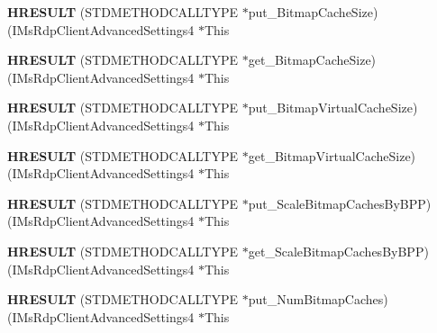 \begin{DoxyCompactItemize}
{\bfseries H\+R\+E\+S\+U\+LT} (S\+T\+D\+M\+E\+T\+H\+O\+D\+C\+A\+L\+L\+T\+Y\+PE $\ast$put\+\_\+\+Bitmap\+Cache\+Size)(I\+Ms\+Rdp\+Client\+Advanced\+Settings4 $\ast$This
\item 
\mbox{\label{struct_i_ms_rdp_client_advanced_settings4_vtbl_a38db615c2de2158bb538d771661db2e8}} 
{\bfseries H\+R\+E\+S\+U\+LT} (S\+T\+D\+M\+E\+T\+H\+O\+D\+C\+A\+L\+L\+T\+Y\+PE $\ast$get\+\_\+\+Bitmap\+Cache\+Size)(I\+Ms\+Rdp\+Client\+Advanced\+Settings4 $\ast$This
\item 
\mbox{\label{struct_i_ms_rdp_client_advanced_settings4_vtbl_a75b9d114f0408e9ed87db1a24fbc9214}} 
{\bfseries H\+R\+E\+S\+U\+LT} (S\+T\+D\+M\+E\+T\+H\+O\+D\+C\+A\+L\+L\+T\+Y\+PE $\ast$put\+\_\+\+Bitmap\+Virtual\+Cache\+Size)(I\+Ms\+Rdp\+Client\+Advanced\+Settings4 $\ast$This
\item 
\mbox{\label{struct_i_ms_rdp_client_advanced_settings4_vtbl_ae0f8388d08dbb1befcd9d616bea58832}} 
{\bfseries H\+R\+E\+S\+U\+LT} (S\+T\+D\+M\+E\+T\+H\+O\+D\+C\+A\+L\+L\+T\+Y\+PE $\ast$get\+\_\+\+Bitmap\+Virtual\+Cache\+Size)(I\+Ms\+Rdp\+Client\+Advanced\+Settings4 $\ast$This
\item 
\mbox{\label{struct_i_ms_rdp_client_advanced_settings4_vtbl_a7631f06eb0ed2900cde5c01ed96a796d}} 
{\bfseries H\+R\+E\+S\+U\+LT} (S\+T\+D\+M\+E\+T\+H\+O\+D\+C\+A\+L\+L\+T\+Y\+PE $\ast$put\+\_\+\+Scale\+Bitmap\+Caches\+By\+B\+PP)(I\+Ms\+Rdp\+Client\+Advanced\+Settings4 $\ast$This
\item 
\mbox{\label{struct_i_ms_rdp_client_advanced_settings4_vtbl_a6b153e150b7fb092049f94e44d00c579}} 
{\bfseries H\+R\+E\+S\+U\+LT} (S\+T\+D\+M\+E\+T\+H\+O\+D\+C\+A\+L\+L\+T\+Y\+PE $\ast$get\+\_\+\+Scale\+Bitmap\+Caches\+By\+B\+PP)(I\+Ms\+Rdp\+Client\+Advanced\+Settings4 $\ast$This
\item 
\mbox{\label{struct_i_ms_rdp_client_advanced_settings4_vtbl_ac69257bd6408ddadf4650d777585525a}} 
{\bfseries H\+R\+E\+S\+U\+LT} (S\+T\+D\+M\+E\+T\+H\+O\+D\+C\+A\+L\+L\+T\+Y\+PE $\ast$put\+\_\+\+Num\+Bitmap\+Caches)(I\+Ms\+Rdp\+Client\+Advanced\+Settings4 $\ast$This

\end{DoxyCompactItemize}
